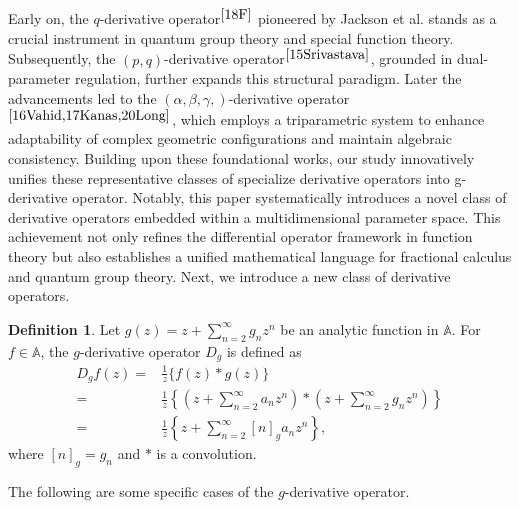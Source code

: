 \documentclass[11pt,twoside, reqno]{article}
\theoremstyle{definition}
\newtheorem{definition}[theorem]{Definition}
\begin{document}
Early on, the $q$-derivative operator$^{\cite{18F}}$ pioneered by Jackson et al. stands as a crucial instrument in quantum group theory and special function theory. 
Subsequently, the $(p,q)$-derivative operator$^{\cite{15Srivastava}}$, grounded in dual-parameter regulation, further expands this structural paradigm. 
Later the advancements led to the $(\alpha,\beta,\gamma,)$-derivative operator$^{\cite{16Vahid,17Kanas,20Long}}$, which employs a triparametric system to 
enhance adaptability of complex geometric configurations and maintain algebraic consistency. Building upon these foundational works, 
our study innovatively unifies these representative classes of specialize derivative operators into g-derivative operator. Notably, 
this paper systematically introduces a novel class of derivative operators embedded within a multidimensional parameter space. 
This achievement not only refines the differential operator framework in function theory but also establishes a unified mathematical language for fractional calculus and quantum group theory. 
Next, we introduce a new class of derivative operators.
\begin{definition}
Let $g(z)=z+\sum_{n=2}^{\infty}g_{n}z^{n}$ be an analytic function in $ \mathbb{A} $. For $f\in \mathbb{A}$, the $g$-derivative operator $D_{g}$ is defined as
\begin{align}\nonumber
D_{g}f(z)=&\frac{1}{z}\{f(z)\ast g(z)\}\\\nonumber
=&\frac{1}{z}\left\{\left(z+\sum_{n=2}^{\infty}a_{n}z^{n}\right) \ast \left(z+ \sum_{n=2}^{\infty}g_{n}z^{n}\right)\right\}\\\nonumber
=&\frac{1}{z}\left\{z+ \sum_{n=2}^{\infty}[n]_{g}a_{n}z^{n}\right\}\nonumber,
\end{align}
where $[n]_{g}=g_{n}$ and $\ast$ is a convolution.

The following are some specific cases of the $g$-derivative operator.
\end{definition}
\end{document}
